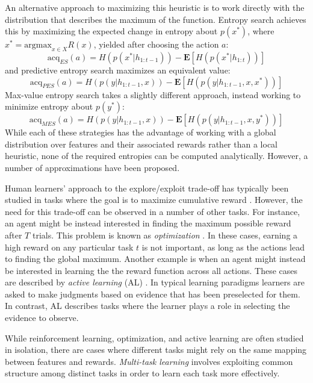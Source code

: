 \documentclass[10pt,letterpaper]{article}
\begin{document}
	An alternative approach to maximizing this heuristic is to work directly with the distribution that describes the maximum of the function. Entropy search \citep{Hennig} achieves this by maximizing the expected change in entropy about $p(x^{*})$, where $x^{*} = \text{argmax}_{x \in X} R(x)$, yielded after choosing the action $a$:
	\begin{equation}
	\text{acq}_{ES}(a) = H(p(x^{*}|h_{1:t-1})) - \mathbf{E}[H(p(x^{*}|h_{1:t}))]
	\end{equation}
	and predictive entropy search \citep{Henrandez-Lobato} maximizes an equivalent value: 
	\begin{equation}
	\text{acq}_{PES}(a) = H(p(y|h_{1:t-1}, x)) - \mathbf{E}[H(p(y|h_{1:t-1}, x, x^{*}))]
	\end{equation}
	Max-value entropy search \cite{Wang} takes a slightly different approach, instead working to minimize entropy about $p(y^{*})$:
	\begin{equation}
	\text{acq}_{MES}(a) = H(p(y|h_{1:t-1}, x)) - \mathbf{E}[H(p(y|h_{1:t-1}, x, y^{*}))]
	\end{equation}
	While each of these strategies has the advantage of working with a global distribution over features and their associated rewards rather than a local heuristic, none of the required entropies can be computed analytically. However, a number of approximations have been proposed.
	
	Human learners' approach to the explore/exploit trade-off has typically been studied in tasks where the goal is to maximize cumulative reward \citep[e.g.][]{Bechara2005, SteyversLeeWagenmakers2009a, SchulzEmmanouilSpeekenbrink2017a}. However, the need for this trade-off can be observed in a number of other tasks. For instance, an agent might be instead interested in finding the maximum possible reward after $T$ trials. This problem is known as \textit{optimization} \citep[e.g.][]{}. In these cases, earning a high reward on any particular task $t$ is not important, as long as the actions lead to finding the global maximum. Another example is when an agent might instead be interested in learning the the reward function across all actions. These cases are described by \textit{active learning} (AL) \citep[e.g.][]{Bramley, BramleyGerstenbergTenenbaum2016a}. In typical learning paradigms learners are asked to make judgments based on evidence that has been preselected for them. In contrast, AL describes tasks where the learner plays a role in selecting the evidence to observe.
	
	While reinforcement learning, optimization, and active learning are often studied in isolation, there are cases where different tasks might rely on the same mapping between features and rewards. \textit{Multi-task learning} \citep[e.g.][]{} involves exploiting common structure among distinct tasks in order to learn each task more effectively.
	
\end{document}
